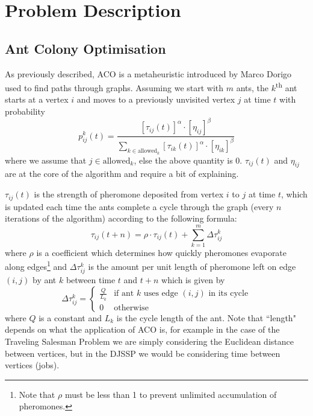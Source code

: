 \documentclass[project-plan]{report-template}
\begin{document}
\section{Problem Description}
\subsection{Ant Colony Optimisation}
As previously described, ACO is a metaheuristic introduced by Marco Dorigo \cite{484436} used to find paths through graphs. Assuming we start with $m$ ants, the $k$\textsuperscript{th} ant starts at a vertex $i$ and moves to a previously unvisited vertex $j$ at time $t$ with probability 
\begin{equation*}
    p_{ij}^k(t) = \frac{\left[\tau_{ij}(t)\right]^\alpha \cdot \left[\eta_{ij}\right]^\beta}{\sum_{k \in \text{allowed}_k}\left[\tau_{ik}(t)\right]^\alpha \cdot \left[\eta_{ik}\right]^\beta}
\end{equation*}
where we assume that $j\in \text{allowed}_k$, else the above quantity is 0. $\tau_{ij}(t)$ and $\eta_{ij}$ are at the core of the algorithm and require a bit of explaining.

$\tau_{ij}(t)$ is the strength of pheromone deposited from vertex $i$ to $j$ at time $t$, which is updated each time the ants complete a cycle through the graph (every $n$ iterations of the algorithm) according to the following formula:
\begin{equation*}
    \tau_{ij}(t + n) = \rho\cdot\tau_{ij}(t) + \sum_{k=1}^m\Delta\tau_{ij}^k
\end{equation*}
where $\rho$ is a coefficient which determines how quickly pheromones evaporate along edges\footnote{Note that $\rho$ must be less than 1 to prevent unlimited accumulation of pheromones.} and $\Delta\tau_{ij}^k$ is the amount per unit length of pheromone left on edge $(i, j)$ by ant $k$ between time $t$ and $t + n$ which is given by
\[
\Delta\tau_{ij}^k = 
\begin{cases}
    \frac{Q}{L_k} & \text{if ant $k$ uses edge $(i, j)$ in its cycle}\\
    0 & \text{otherwise}
\end{cases}
\]
where $Q$ is a constant and $L_k$ is the cycle length of the ant. Note that ``length" depends on what the application of ACO is, for example in the case of the Traveling Salesman Problem \cite{enwiki:1292600322} we are simply considering the Euclidean distance between vertices, but in the DJSSP we would be considering time between vertices (jobs).
\end{document}
